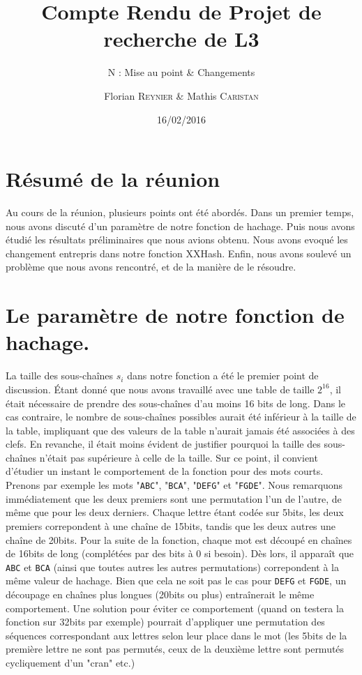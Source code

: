 \documentclass[final,twoside,article,10pt]{scrartcl}
\begin{document}
%
\title{Compte Rendu de Projet de recherche de L3}
\subtitle{N : Mise au point \& Changements}
\author{Florian \textsc{Reynier} \& Mathis \textsc{Caristan}}
%
\date{16/02/2016}

\maketitle

\section*{Résumé de la réunion}
    Au cours de la réunion, plusieurs points ont été abordés.
    Dans un premier temps, nous avons discuté d'un paramètre de notre fonction de hachage.
    Puis nous avons étudié les résultats préliminaires que nous avions obtenu.
    Nous avons evoqué les changement entrepris dans notre fonction XXHash.
    Enfin, nous avons soulevé un problème que nous avons rencontré, et de la manière de le résoudre.

\section{Le paramètre de notre fonction de hachage.}
    La taille des sous-chaînes $s_i$ dans notre fonction a été le premier point de discussion.
    \'Etant donné que nous avons travaillé avec une table de taille $2^{16}$, il était nécessaire de prendre des sous-chaînes d'au moins 16 bits de long. Dans le cas contraire, le nombre de sous-chaînes possibles aurait été inférieur à la taille de la table, impliquant que des valeurs de la table n'aurait jamais été associées à des clefs.
    En revanche, il était moins évident de justifier pourquoi la taille des sous-chaînes n'était pas supérieure à celle de la taille.
    Sur ce point, il convient d'étudier un instant le comportement de la fonction pour des mots courts.
    Prenons par exemple les mots "\texttt{ABC}", "\texttt{BCA}", "\texttt{DEFG}" et "\texttt{FGDE}". Nous remarquons immédiatement que les deux premiers sont une permutation l'un de l'autre, de même que pour les deux derniers.
    Chaque lettre étant codée sur 5bits, les deux premiers correpondent à une chaîne de 15bits, tandis que les deux autres une chaîne de 20bits.
    Pour la suite de la fonction, chaque mot est découpé en chaînes de 16bits de long (complétées par des bits à 0 si besoin).
    Dès lors, il apparaît que \texttt{ABC} et \texttt{BCA} (ainsi que toutes autres les autres permutations) correpondent à la même valeur de hachage.
    Bien que cela ne soit pas le cas pour \texttt{DEFG} et \texttt{FGDE}, un découpage en chaînes plus longues (20bits ou plus) entraînerait le même comportement.
    Une solution pour éviter ce comportement (quand on testera la fonction sur 32bits par exemple) pourrait d'appliquer une permutation des séquences correspondant aux lettres selon leur place dans le mot (les 5bits de la première lettre ne sont pas permutés, ceux de la deuxième lettre sont permutés cycliquement d'un "cran" etc.) 
\end{document}
